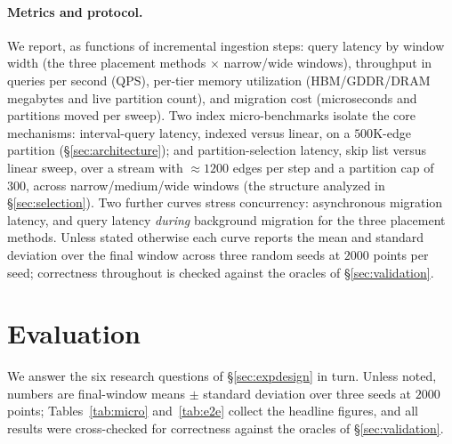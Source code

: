 \documentclass[10pt]{article}
\theoremstyle{definition}
\begin{document}
\paragraph{Metrics and protocol.}
We report, as functions of incremental ingestion steps: query latency by window
width (the three placement methods $\times$ narrow/wide windows), throughput in
queries per second (QPS), per-tier memory utilization (HBM/GDDR/DRAM megabytes and
live partition count), and migration cost (microseconds and partitions moved per
sweep). Two index micro-benchmarks isolate the core mechanisms: interval-query
latency, indexed versus linear, on a $500$K-edge partition
(\S\ref{sec:architecture}); and partition-selection latency, skip list versus
linear sweep, over a stream with $\approx 1200$ edges per step and a partition cap
of $300$, across narrow/medium/wide windows (the structure analyzed in
\S\ref{sec:selection}). Two further curves stress concurrency: asynchronous
migration latency, and query latency \emph{during} background migration for the
three placement methods. Unless stated otherwise each curve reports the mean and
standard deviation over the final window across three random seeds at $2000$ points
per seed; correctness throughout is checked against the oracles of
\S\ref{sec:validation}.

\section{Evaluation}
\label{sec:evaluation}

We answer the six research questions of \S\ref{sec:expdesign} in turn. Unless
noted, numbers are final-window means $\pm$ standard deviation over three seeds at
$2000$ points; Tables~\ref{tab:micro} and~\ref{tab:e2e} collect the headline
figures, and all results were cross-checked for correctness against the oracles of
\S\ref{sec:validation}.
\end{document}
